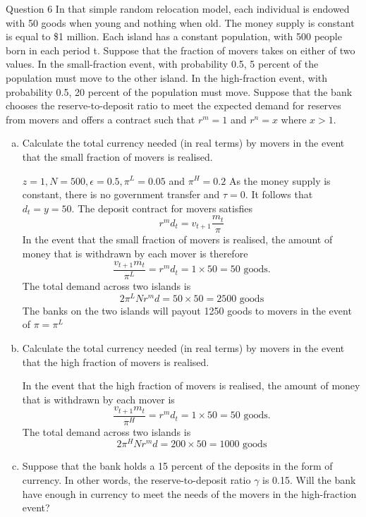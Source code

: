 \documentclass[a4paper]{article}
\newif\IfInSansMode
\numberwithin{equation}{section}
\numberwithin{figure}{section}
\begin{document}
	\begin{questionbox}{Question 6}
		In that simple random relocation model, each individual is endowed with 50 goods when young and nothing when old. The money supply is constant is equal to \$1 million. Each island has a constant population, with 500 people born in each period t. Suppose that the fraction of movers takes on either of two values. In the small-fraction event, with probability 0.5, 5 percent of the population must move to the other island. In the high-fraction event, with probability 0.5, 20 percent of the population must move. Suppose that the bank chooses the reserve-to-deposit ratio to meet the expected demand for reserves from movers and offers a contract such that \( r^m = 1 \) and \( r^n = x \) where \( x>1 \).
		\begin{enumerate}[(a)]
			\item Calculate the total currency needed (in real terms) by movers in the event that the small fraction of movers is realised.
			\begin{explanationbox}
				\( z = 1, N = 500, \epsilon = 0.5, \pi^L=0.05 \) and \( \pi^H=0.2 \) As the money supply is constant, there is no government transfer and \( \tau = 0 \). It follows that \( d_t = y = 50. \) The deposit contract for movers satisfies
				\[
					r^m d_t = v_{t+1} \frac{m_t}{\pi}
				\]
				In the event that the small fraction of movers is realised, the amount of money that is withdrawn by each mover is therefore
				\[
					\frac{v_{t+1}m_t}{\pi^L} = r^m d_t = 1 \times 50 = 50 \text{ goods}.
				\]
				The total demand across two islands is
				\[
					2\pi^L N r^m d = 50 \times 50 = 2500 \text{ goods}
				\]
				The banks on the two islands will payout 1250 goods to movers in the event of \( \pi = \pi^L \)
			\end{explanationbox}
			\item Calculate the total currency needed (in real terms) by movers in the event that the high fraction of movers is realised.
			\begin{explanationbox}
				In the event that the high fraction of movers is realised, the amount of money that is withdrawn by each mover is
				\[
					\frac{v_{t+1}m_t}{\pi^H} = r^m d_t = 1 \times 50 = 50 \text{ goods}.
				\]
				The total demand across two islands is
				\[
					2\pi^H N r^m d = 200 \times 50 = 1000 \text{ goods}
				\]
			\end{explanationbox}\pagebreak
			\item Suppose that the bank holds a 15 percent of the deposits in the form of currency. In other words, the reserve-to-deposit ratio \( \gamma \) is 0.15. Will the bank have enough in currency to meet the needs of the movers in the high-fraction event?

\end{enumerate}
\end{questionbox}
\end{document}
